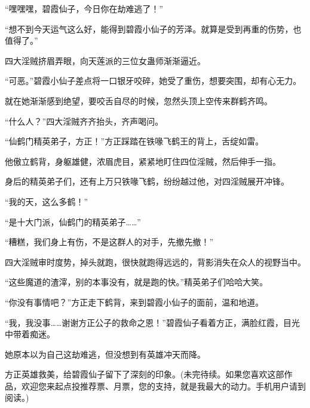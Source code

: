 \begin{this_body}
“嘿嘿嘿，碧霞仙子，今日你在劫难逃了！”

“想不到今天运气这么好，能得到碧霞小仙子的芳泽。就算是受到再重的伤势，也值得了。”

四大淫贼挤眉弄眼，向天莲派的三位女蛊师渐渐逼近。

“可恶。”碧霞小仙子差点将一口银牙咬碎，她受了重伤，想要突围，却有心无力。

就在她渐渐感到绝望，要咬舌自尽的时候，忽然头顶上空传来群鹤齐鸣。

“什么人？”四大淫贼齐齐抬头，齐声喝问。

“仙鹤门精英弟子，方正！”方正踩踏在铁喙飞鹤王的背上，舌绽如雷。

他傲立鹤背，身躯雄健，浓眉虎目，紧紧地盯住四位淫贼，然后伸手一指。

身后的精英弟子们，还有上万只铁喙飞鹤，纷纷越过他，对四淫贼展开冲锋。

“我的天，这么多鹤！”

“是十大门派，仙鹤门的精英弟子……”

“糟糕，我们身上有伤，不是这群人的对手，先撤先撤！”

四大淫贼审时度势，掉头就跑，很快就跑得远远的，背影消失在众人的视野当中。

“这些魔道的渣滓，别的本事没有，就是跑的快。”精英弟子们哈哈大笑。

“你没有事情吧？”方正走下鹤背，来到碧霞小仙子的面前，温和地道。

“我，我没事……谢谢方正公子的救命之恩！”碧霞仙子看着方正，满脸红霞，目光中带着痴迷。

她原本以为自己这劫难逃，但没想到有英雄冲天而降。

方正英雄救美，给碧霞仙子留下了深刻的印象。(未完待续。如果您喜欢这部作品，欢迎您来起点投推荐票、月票，您的支持，就是我最大的动力。手机用户请到阅读。)

\end{this_body}

